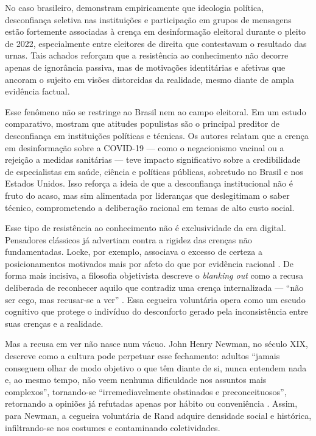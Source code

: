 No caso brasileiro,  demonstram empiricamente que ideologia política, desconfiança seletiva nas instituições e participação em grupos de mensagens estão fortemente associadas à crença em desinformação eleitoral durante o pleito de 2022, especialmente entre eleitores de direita que contestavam o resultado das urnas. Tais achados reforçam que a resistência ao conhecimento não decorre apenas de ignorância passiva, mas de motivações identitárias e afetivas que ancoram o sujeito em visões distorcidas da realidade, mesmo diante de ampla evidência factual.

Esse fenômeno não se restringe ao Brasil nem ao campo eleitoral. Em um estudo comparativo,  mostram que atitudes populistas são o principal preditor de desconfiança em instituições políticas e técnicas. Os autores relatam que a crença em desinformação sobre a COVID-19 — como o negacionismo vacinal ou a rejeição a medidas sanitárias — teve impacto significativo sobre a credibilidade de especialistas em saúde, ciência e políticas públicas, sobretudo no Brasil e nos Estados Unidos. Isso reforça a ideia de que a desconfiança institucional não é fruto do acaso, mas sim alimentada por lideranças que deslegitimam o saber técnico, comprometendo a deliberação racional em temas de alto custo social.

Esse tipo de resistência ao conhecimento não é exclusividade da era digital. Pensadores clássicos já advertiam contra a rigidez das crenças não fundamentadas. Locke, por exemplo, associava o excesso de certeza a posicionamentos motivados mais por afeto do que por evidência racional \cite{locke2014ensaio}. De forma mais incisiva, a filosofia objetivista descreve o \textit{blanking out} como a recusa deliberada de reconhecer aquilo que contradiz uma crença internalizada — “não ser cego, mas recusar-se a ver” \cite[p.~869]{rand2012revolta}. Essa cegueira voluntária opera como um escudo cognitivo que protege o indivíduo do desconforto gerado pela inconsistência entre suas crenças e a realidade.

Mas a recusa em ver não nasce num vácuo. John Henry Newman, no século XIX, descreve como a cultura pode perpetuar esse fechamento: adultos “jamais conseguem olhar de modo objetivo o que têm diante de si, nunca entendem nada e, ao mesmo tempo, não veem nenhuma dificuldade nos assuntos mais complexos”, tornando-se “irremediavelmente obstinados e preconceituosos”, retornando a opiniões já refutadas apenas por hábito ou conveniência \cite[p.~115-116]{newman2020ideia}. Assim, para Newman, a cegueira voluntária de Rand adquire densidade social e histórica, infiltrando-se nos costumes e contaminando coletividades.

